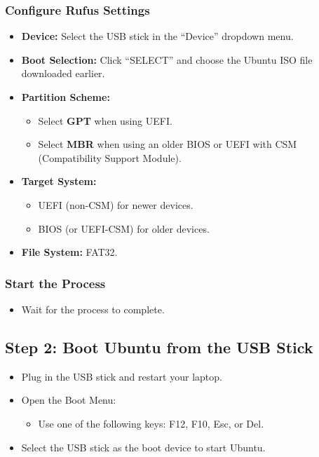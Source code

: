 \subsubsection{Configure Rufus Settings}
\begin{itemize}
    \item \textbf{Device:} Select the USB stick in the “Device” dropdown menu.
    \item \textbf{Boot Selection:} Click “SELECT” and choose the Ubuntu ISO file downloaded earlier.
    \item \textbf{Partition Scheme:}
    \begin{itemize}
        \item Select \textbf{GPT} when using UEFI.
        \item Select \textbf{MBR} when using an older BIOS or UEFI with CSM (Compatibility Support Module).
    \end{itemize}
    \item \textbf{Target System:}
    \begin{itemize}
        \item UEFI (non-CSM) for newer devices.
        \item BIOS (or UEFI-CSM) for older devices.
    \end{itemize}
    \item \textbf{File System:} FAT32.
\end{itemize}

\subsubsection{Start the Process}
\begin{itemize}
    \item Wait for the process to complete.
\end{itemize}

\subsection{Step 2: Boot Ubuntu from the USB Stick}
\begin{itemize}
    \item Plug in the USB stick and restart your laptop.
    \item Open the Boot Menu:
    \begin{itemize}
        \item Use one of the following keys: F12, F10, Esc, or Del.
    \end{itemize}
    \item Select the USB stick as the boot device to start Ubuntu.
\end{itemize}

